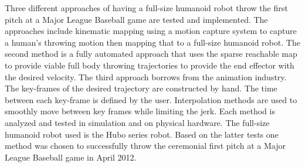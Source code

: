 Three different approaches of having a full-size humanoid robot throw the first pitch at a Major League Baseball game are tested and implemented.  
The approaches include kinematic mapping using a motion capture system to capture a human's throwing motion then mapping that to a full-size humanoid robot.  
The second method is a fully automated approach that uses the sparse reachable map to provide viable full body throwing trajectories to provide the end effector with the desired velocity.  
The third approach borrows from the animation industry.  
The key-frames of the desired trajectory are constructed by hand.  
The time between each key-frame is defined by the user.  
Interpolation methods are used to smoothly move between key frames while limiting the jerk.  
Each method is analyzed and tested in simulation and on physical hardware.  
The full-size humanoid robot used is the Hubo series robot.  
Based on the latter tests one method was chosen to successfully throw the ceremonial first pitch at a Major League Baseball game in April 2012.